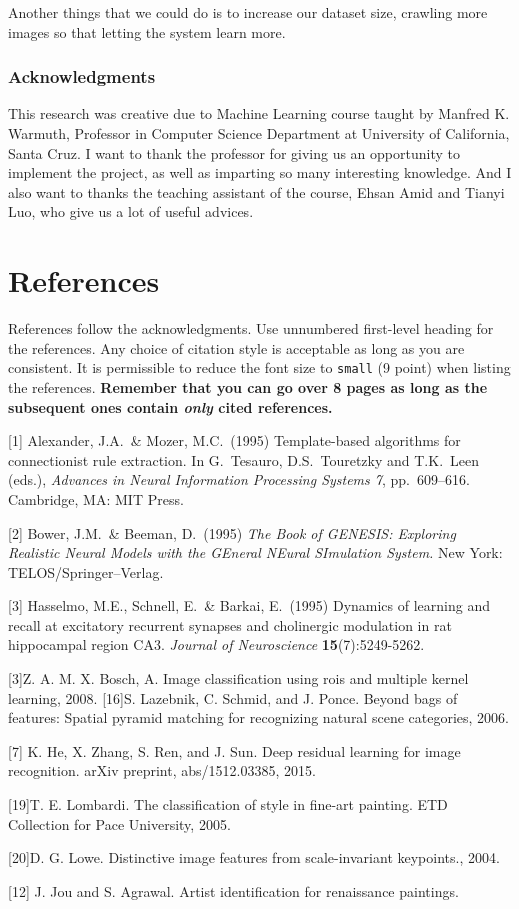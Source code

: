 \documentclass{article}
\begin{document}
Another things that we could do is to increase our dataset size, crawling more images so that letting the system learn more.

\subsubsection*{Acknowledgments}
This research was creative due to Machine Learning course taught by Manfred K. Warmuth, Professor in Computer Science Department at University of California, Santa Cruz. I want to thank the professor for giving us an opportunity to implement the project, as well as imparting so many interesting knowledge. And I also want to thanks the teaching assistant of the course, Ehsan Amid and Tianyi Luo, who give us a lot of useful advices.






\section*{References}

References follow the acknowledgments. Use unnumbered first-level
heading for the references. Any choice of citation style is acceptable
as long as you are consistent. It is permissible to reduce the font
size to \verb+small+ (9 point) when listing the references. {\bf
  Remember that you can go over 8 pages as long as the subsequent ones contain
  \emph{only} cited references.}
\medskip

\small

[1] Alexander, J.A.\ \& Mozer, M.C.\ (1995) Template-based algorithms
for connectionist rule extraction. In G.\ Tesauro, D.S.\ Touretzky and
T.K.\ Leen (eds.), {\it Advances in Neural Information Processing
  Systems 7}, pp.\ 609--616. Cambridge, MA: MIT Press.

[2] Bower, J.M.\ \& Beeman, D.\ (1995) {\it The Book of GENESIS:
  Exploring Realistic Neural Models with the GEneral NEural SImulation
  System.}  New York: TELOS/Springer--Verlag.

[3] Hasselmo, M.E., Schnell, E.\ \& Barkai, E.\ (1995) Dynamics of
learning and recall at excitatory recurrent synapses and cholinergic
modulation in rat hippocampal region CA3. {\it Journal of
  Neuroscience} {\bf 15}(7):5249-5262.
  
  
[3]Z. A. M. X. Bosch, A. Image classification using rois and multiple kernel learning, 2008. [16]S. Lazebnik, C. Schmid, and J. Ponce. Beyond bags of features: Spatial pyramid matching for recognizing natural scene categories, 2006.

[7] K. He, X. Zhang, S. Ren, and J. Sun. Deep residual learning for image recognition. arXiv preprint, abs/1512.03385,
2015.
 
[19]T. E. Lombardi. The classification of style in fine-art painting. ETD Collection for Pace University, 2005. 

[20]D. G. Lowe. Distinctive image features from scale-invariant keypoints., 2004. 

[12] J. Jou and S. Agrawal. Artist identification for renaissance paintings.
  
\end{document}
